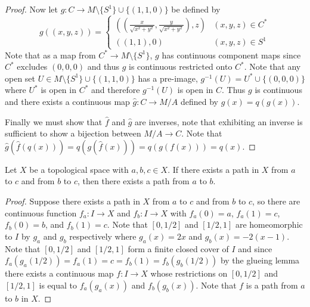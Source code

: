 \documentclass{homework651}
\begin{document}
\begin{problems}
\begin{proof}
    Now let $g: C \to M\setminus \{S^1\} \cup \{(1, 1, 0)\}$ be defined by
    \begin{equation*}
        g((x, y, z)) = \begin{cases}
            \left(\left(\frac{x}{\sqrt{x^2 + y^2}}, \frac{y}{\sqrt{x^2 + y^2}}\right), z\right) & (x, y, z) \in C^*\\
            ((1, 1), 0) & (x, y, z) \in S^1
        \end{cases}
    \end{equation*} 
    Note that as a map from $C^* \to M\setminus \{S^1\}$, $g$ has continuous component maps since $C^*$ excludes $(0, 0, 0)$ and thus $g$ is continuous restricted onto $C^*$. Note that any open set $U \in  M\setminus \{S^1\} \cup \{(1, 1, 0)\}$ has a pre-image, $g^{-1}(U) = U^* \cup \{(0,0,0)\}$ where $U^*$ is open in $C^*$ and therefore $g^{-1}(U)$ is open in $C$. Thus $g$ is continuous and there exists a continuous map $\hat{g}: C \to M/A$ defined by $\hat{g}(x) = q(g(x))$.

    Finally we must show that $\hat{f}$ and $\hat{g}$ are inverses, note that exhibiting an inverse
    is sufficient to show a bijection between $M/A \to C$. Note that $\hat{g}(\hat{f}(q(x))) = q(g(\hat{f}(x))) = q(g(f(x))) = q(x)$. 
\end{proof}


\begin{lemma}{1} Let $X$ be a topological space with $a, b, c \in X$. If there exists a path in $X$ from $a$ to $c$ and from $b$ to $c$, then there exists a path from $a$ to $b$. 
    \begin{proof} Suppose there exists a path in $X$ from $a$ to $c$ and from $b$ to $c$, so there are continuous function $f_a:I \to X$ and $f_b:I \to X$ with $f_a(0) = a$, $f_a(1) = c$, $f_b(0) = b$, and $f_b(1) = c$. Note that $[0, 1/2]$ and $[1/2, 1]$ are homeomorphic to $I$ by $g_a$ and $g_b$ respectively where $g_a(x) = 2x$ and $g_b(x) = -2(x - 1)$. Note that $[0, 1/2]$ and $[1/2, 1]$ form a finite closed cover of $I$ and since $f_a(g_a(1/2)) = f_a(1) = c = f_b(1) = f_b(g_b(1/2))$ by the glueing lemma there exists a continuous map $f:I \to X$ whose restrictions on $[0, 1/2]$ and $[1/2, 1]$
    is equal to $f_a(g_a(x))$ and $f_b(g_b(x))$. Note that $f$ is a path from $a$ to $b$ in $X$. 
    \end{proof}
\end{lemma}


\end{problems}
\end{document}
